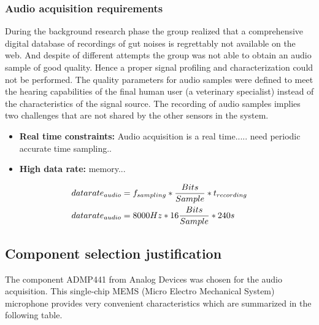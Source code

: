 \subsubsection{Audio acquisition requirements}
During the background research phase the group realized that a comprehensive digital database of recordings of gut noises is regrettably not available on the web. And despite of different attempts the group was not able to obtain an audio sample of good quality. Hence a proper signal profiling and characterization could not be performed. The quality parameters for audio samples were defined to meet the hearing capabilities of the final human user (a veterinary specialist) instead of the characteristics of the signal source.
The recording of audio samples implies two challenges that are not shared by the other sensors in the system.
\begin{itemize}
\item \textbf{Real time constraints:} Audio acquisition is a real time..... need periodic accurate time sampling.. 
\item \textbf{High data rate:} memory...
\end{itemize}

\begin{align*}
\centering
datarate_{audio}&=f_{sampling} * \frac{Bits}{Sample}* t_{recording} \\
datarate_{audio}&=8000 Hz * 16 \frac{Bits}{Sample}* 240s
\end{align*}


\subsection{Component selection justification}
The component ADMP441 from Analog Devices was chosen for the audio acquisition. This single-chip MEMS (Micro Electro Mechanical System) microphone provides very convenient characteristics which are summarized in the following table.

